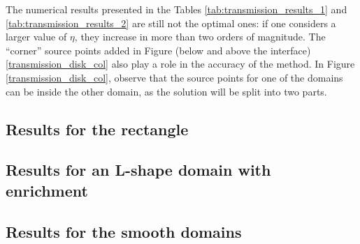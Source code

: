 The numerical results presented in the Tables \ref{tab:transmission_results_1} and \ref{tab:transmission_results_2} are still not the optimal ones: if one considers a larger value of \(\eta\), they increase in more than two orders of magnitude. The ``corner'' source points added in Figure (below and above the interface) \ref{transmission_disk_col} also play a role in the accuracy of the method. In Figure \ref{transmission_disk_col}, observe that the source points for one of the domains can be inside the other domain, as the solution will be split into two parts.

\subsection{Results for the rectangle}

\subsection{Results for an L-shape domain with enrichment}

\subsection{Results for the smooth domains}
